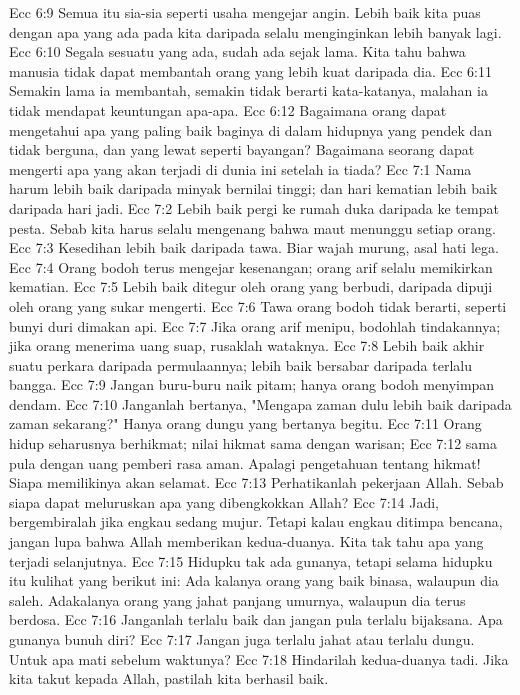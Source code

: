Ecc 6:9  Semua itu sia-sia seperti usaha mengejar angin. Lebih baik kita puas dengan apa yang ada pada kita daripada selalu menginginkan lebih banyak lagi.
Ecc 6:10  Segala sesuatu yang ada, sudah ada sejak lama. Kita tahu bahwa manusia tidak dapat membantah orang yang lebih kuat daripada dia.
Ecc 6:11  Semakin lama ia membantah, semakin tidak berarti kata-katanya, malahan ia tidak mendapat keuntungan apa-apa.
Ecc 6:12  Bagaimana orang dapat mengetahui apa yang paling baik baginya di dalam hidupnya yang pendek dan tidak berguna, dan yang lewat seperti bayangan? Bagaimana seorang dapat mengerti apa yang akan terjadi di dunia ini setelah ia tiada?
Ecc 7:1  Nama harum lebih baik daripada minyak bernilai tinggi; dan hari kematian lebih baik daripada hari jadi.
Ecc 7:2  Lebih baik pergi ke rumah duka daripada ke tempat pesta. Sebab kita harus selalu mengenang bahwa maut menunggu setiap orang.
Ecc 7:3  Kesedihan lebih baik daripada tawa. Biar wajah murung, asal hati lega.
Ecc 7:4  Orang bodoh terus mengejar kesenangan; orang arif selalu memikirkan kematian.
Ecc 7:5  Lebih baik ditegur oleh orang yang berbudi, daripada dipuji oleh orang yang sukar mengerti.
Ecc 7:6  Tawa orang bodoh tidak berarti, seperti bunyi duri dimakan api.
Ecc 7:7  Jika orang arif menipu, bodohlah tindakannya; jika orang menerima uang suap, rusaklah wataknya.
Ecc 7:8  Lebih baik akhir suatu perkara daripada permulaannya; lebih baik bersabar daripada terlalu bangga.
Ecc 7:9  Jangan buru-buru naik pitam; hanya orang bodoh menyimpan dendam.
Ecc 7:10  Janganlah bertanya, "Mengapa zaman dulu lebih baik daripada zaman sekarang?" Hanya orang dungu yang bertanya begitu.
Ecc 7:11  Orang hidup seharusnya berhikmat; nilai hikmat sama dengan warisan;
Ecc 7:12  sama pula dengan uang pemberi rasa aman. Apalagi pengetahuan tentang hikmat! Siapa memilikinya akan selamat.
Ecc 7:13  Perhatikanlah pekerjaan Allah. Sebab siapa dapat meluruskan apa yang dibengkokkan Allah?
Ecc 7:14  Jadi, bergembiralah jika engkau sedang mujur. Tetapi kalau engkau ditimpa bencana, jangan lupa bahwa Allah memberikan kedua-duanya. Kita tak tahu apa yang terjadi selanjutnya.
Ecc 7:15  Hidupku tak ada gunanya, tetapi selama hidupku itu kulihat yang berikut ini: Ada kalanya orang yang baik binasa, walaupun dia saleh. Adakalanya orang yang jahat panjang umurnya, walaupun dia terus berdosa.
Ecc 7:16  Janganlah terlalu baik dan jangan pula terlalu bijaksana. Apa gunanya bunuh diri?
Ecc 7:17  Jangan juga terlalu jahat atau terlalu dungu. Untuk apa mati sebelum waktunya?
Ecc 7:18  Hindarilah kedua-duanya tadi. Jika kita takut kepada Allah, pastilah kita berhasil baik.
